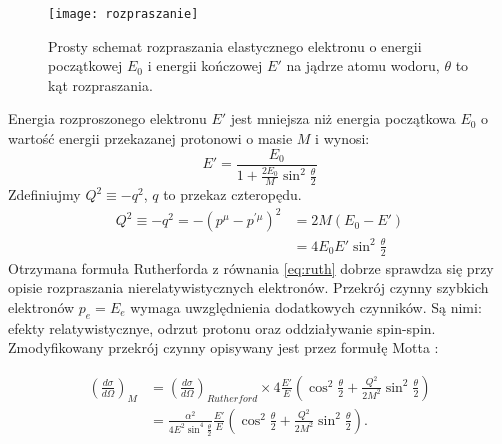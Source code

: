 \documentclass[11pt]{book}
\theoremstyle{definition}
\begin{document}
\begin{figure}[htp!]
	\centering
\texttt{[image: rozpraszanie]}
	\caption{Prosty schemat rozpraszania elastycznego elektronu o energii początkowej $E_0$  i energii kończowej $E'$ na jądrze atomu wodoru, $\theta$ to kąt rozpraszania.}
	\label{fig:scactter}
\end{figure}
%
Energia rozproszonego elektronu $E'$ jest mniejsza niż energia początkowa $E_0$ o wartość energii przekazanej protonowi o masie $M$ i wynosi:
%
\begin{equation}
E' = \frac{E_0}{1 + \frac{2E_0}{M}\sin^2 \frac{\theta}{2}}
\end{equation}
%
Zdefiniujmy $ Q^2 \equiv - q^2 $, $q$ to przekaz czteropędu.
%
\begin{equation}
\begin{split}
Q^2 \equiv - q^2 = -(p^{\mu} - p^{'\mu})^2 &= 2M\left(E_0 - E'\right) \\
& = 4 E_0 E' \sin^2 \frac{\theta}{2}
\end{split}
\end{equation}
%
Otrzymana formuła Rutherforda z równania \ref{eq:ruth} dobrze sprawdza się przy opisie rozpraszania nierelatywistycznych elektronów. Przekrój czynny szybkich elektronów $p_e = E_e$ wymaga uwzględnienia dodatkowych czynników. Są nimi: efekty relatywistycznye, odrzut protonu oraz oddziaływanie spin-spin. Zmodyfikowany przekrój czynny opisywany jest przez formułę Motta \cite{10.1088/978-0-7503-1140-3}:



\begin{equation}
\begin{split}
\left( \frac{d\sigma}{d\Omega} \right)_M  &= \left( \frac{d\sigma}{d\Omega} \right)_{Rutherford} \times 4\frac{E'}{E}\left( \cos^2 \frac{\theta}{2} + \frac{Q^2}{2M^2}\sin^2\frac{\theta}{2}\right) \\ 
& =  \frac{\alpha^2 }{4E^2\sin^4 \frac{\theta}{2}} \frac{E'}{E} \left( \cos^2 \frac{\theta}{2} + \frac{Q^2}{2M^2}\sin^2\frac{\theta}{2}\right). \label{eq:mott}
\end{split}
\end{equation}


\end{document}
